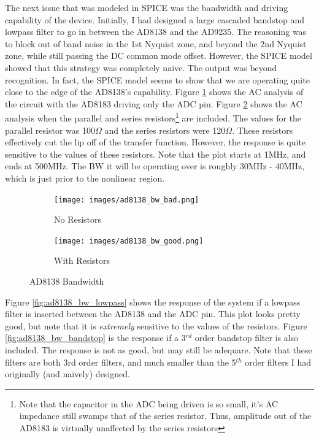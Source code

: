 \documentclass[a4paper, 12pt, notitlepage]{article}
\begin{document}
The next issue that was modeled in SPICE was the bandwidth and driving capability of the device.  Initially, I had designed a large cascaded bandstop and lowpass filter to go in between the AD8138 and the AD9235.  The reasoning was to block out of band noise in the 1st Nyquist zone, and beyond the 2nd Nyquist zone, while still passing the DC common mode offset.  However, the SPICE model showed that this strategy was completely naive.  The output was beyond recognition.  In fact, the SPICE model seems to show that we are operating quite close to the edge of the AD8138's capability.  Figure \ref{fig:ad8138_bw_bad} shows the AC analysis of the circuit with the AD8183 driving only the ADC pin.  Figure \ref{fig:ad8138_bw_good} shows the AC analysis when the parallel and series resistors\footnote{Note that the capacitor in the ADC being driven is so small, it's AC impedance still swamps that of the series resistor.  Thus, amplitude out of the AD8183 is virtually unaffected by the series resistors} are included.  The values for the parallel resistor was 100$\Omega$ and the series resistors were 120$\Omega$.  These resistors effectively cut the lip off of the transfer function.  However, the response is quite sensitive to the values of these resistors.  Note that the plot starts at 1MHz, and ends at 500MHz.  The BW it will be operating over is roughly 30MHz - 40MHz, which is just prior to the nonlinear region.

\begin{figure}[ht]
\centering
\begin{subfigure}[b]{0.45\textwidth}
  \texttt{[image: images/ad8138\_bw\_bad.png]}
  \caption{No Resistors}
  \label{fig:ad8138_bw_bad}
\end{subfigure}
\begin{subfigure}[b]{0.45\textwidth}  
  \texttt{[image: images/ad8138\_bw\_good.png]}
  \caption{With Resistors}
  \label{fig:ad8138_bw_good}
\end{subfigure}

\caption{AD8138 Bandwidth}
\label{fig:ad8138_bw}
\end{figure}

Figure \ref{fig:ad8138_bw_lowpass} shows the response of the system if a lowpass filter is inserted between the AD8138 and the ADC pin.  This plot looks pretty good, but note that it is \textit{extremely} sensitive to the values of the resistors.  Figure \ref{fig:ad8138_bw_bandstop} is the response if a 3$^{rd}$ order bandstop filter is also included.  The response is not as good, but may still be adequare.  Note that these filters are both 3rd order filters, and much smaller than the 5$^{th}$ order filters I had originally (and naively) designed.
\end{document}
